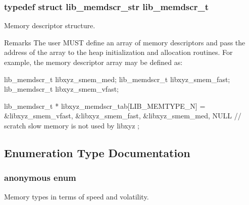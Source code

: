 \subsubsection[{lib\+\_\+memdscr\+\_\+t}]{\setlength{\rightskip}{0pt plus 5cm}typedef struct {\bf lib\+\_\+memdscr\+\_\+str}  {\bf lib\+\_\+memdscr\+\_\+t}}\label{group__libarch__memmgt_ga933f44304562f9591104d57b7868ebc3}


Memory descriptor structure. 

\begin{DoxyRemark}{Remarks}
The user M\+U\+S\+T define an array of memory descriptors and pass the address of the array to the heap initialization and allocation routines. For example, the memory descriptor array may be defined as\+: \begin{DoxyVerb}    lib_memdscr_t libxyz_smem_med;
    lib_memdscr_t libxyz_smem_fast;
    lib_memdscr_t libxyz_smem_vfast;
    
    lib_memdscr_t * libxyz_memdscr_tab[LIB_MEMTYPE_N] = {
      &libxyz_smem_vfast,
      &libxyz_smem_fast,
      &libxyz_smem_med,
      NULL                // scratch slow memory is not used by libxyz 
    };\end{DoxyVerb}
 
\end{DoxyRemark}


\subsection{Enumeration Type Documentation}
\hypertarget{group__libarch__memmgt_ga06fc87d81c62e9abb8790b6e5713c55b}{}\subsubsection[{anonymous enum}]{\setlength{\rightskip}{0pt plus 5cm}anonymous enum}\label{group__libarch__memmgt_ga06fc87d81c62e9abb8790b6e5713c55b}


Memory types in terms of speed and volatility. 

